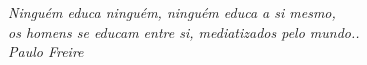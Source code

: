 \begin{epigrafe}
\vspace*{\fill}
\begin{flushright}
\emph{Ninguém educa ninguém, ninguém educa a si mesmo, 
 \\os homens se educam entre si, mediatizados pelo mundo.. 
  \\ Paulo Freire}
\end{flushright}
\end{epigrafe}

